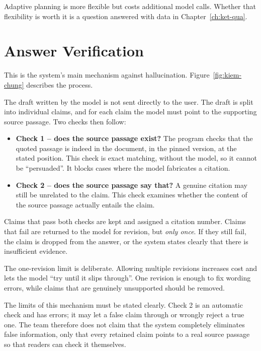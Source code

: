 Adaptive planning is more flexible but costs additional model calls. Whether that flexibility is worth it is a question answered with data in Chapter~\ref{ch:ket-qua}.

\section{Answer Verification}
\label{sec:kiem-chung}

This is the system's main mechanism against hallucination. Figure~\ref{fig:kiem-chung} describes the process.


The draft written by the model is not sent directly to the user. The draft is split into individual claims, and for each claim the model must point to the supporting source passage. Two checks then follow:

\begin{itemize}
    \item \textbf{Check 1 -- does the source passage exist?} The program checks that the quoted passage is indeed in the document, in the pinned version, at the stated position. This check is exact matching, without the model, so it cannot be ``persuaded''. It blocks cases where the model fabricates a citation.
    \item \textbf{Check 2 -- does the source passage say that?} A genuine citation may still be unrelated to the claim. This check examines whether the content of the source passage actually entails the claim.
\end{itemize}

Claims that pass both checks are kept and assigned a citation number. Claims that fail are returned to the model for revision, but \emph{only once}. If they still fail, the claim is dropped from the answer, or the system states clearly that there is insufficient evidence.

The one-revision limit is deliberate. Allowing multiple revisions increases cost and lets the model ``try until it slips through''. One revision is enough to fix wording errors, while claims that are genuinely unsupported should be removed.

The limits of this mechanism must be stated clearly. Check 2 is an automatic check and has errors; it may let a false claim through or wrongly reject a true one. The team therefore does not claim that the system completely eliminates false information, only that every retained claim points to a real source passage so that readers can check it themselves.

